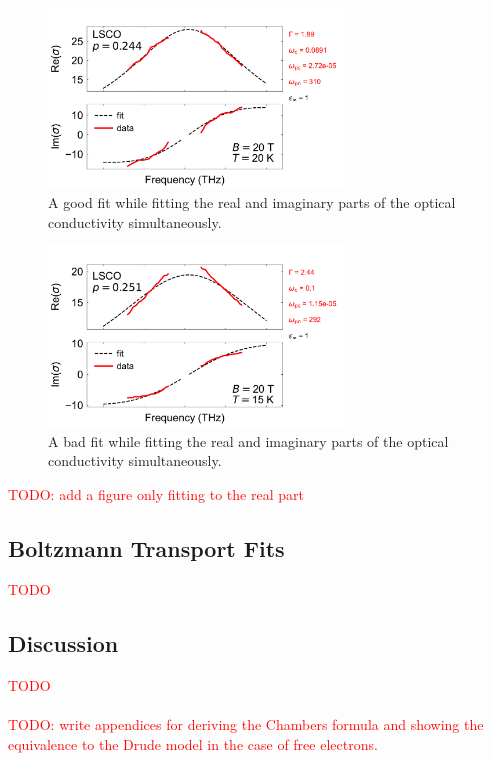 \documentclass[12pt]{article}
\begin{document}
\begin{figure}
    \centering
    \includegraphics[width=0.7\textwidth]{figures/drude_fit_good.pdf}
    \caption{A good fit while fitting the real and imaginary parts of the optical conductivity
        simultaneously.}
    \label{fig:drude_fit_good}
\end{figure}
\begin{figure}
    \centering
    \includegraphics[width=0.7\textwidth]{figures/drude_fit_bad.pdf}
    \caption{A bad fit while fitting the real and imaginary parts of the optical conductivity
        simultaneously.}
    \label{fig:drude_fit_bad}
\end{figure}
\textcolor{red}{TODO: add a figure only fitting to the real part}

\subsection{Boltzmann Transport Fits}
\textcolor{red}{TODO}
\subsection{Discussion}
\textcolor{red}{TODO}\\\\
\textcolor{red}{TODO: write appendices for deriving the Chambers formula and showing the equivalence
to the Drude model in the case of free electrons.}



\end{document}

